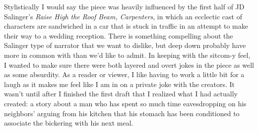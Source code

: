 \documentclass[]{book}
\begin{document}
Stylistically I would say the piece was heavily influenced by the first
half of JD Salinger's \emph{Raise High the Roof Beam, Carpenters}, in
which an ecclectic cast of characters are sandwiched in a car that is
stuck in traffic in an attempt to make their way to a wedding reception.
There is something compelling about the Salinger type of narrator that
we want to dislike, but deep down probably have more in common with than
we'd like to admit. In keeping with the sitcom-y feel, I wanted to make
sure there were both layered and overt jokes in the piece as well as
some absurdity. As a reader or viewer, I like having to work a little
bit for a laugh as it makes me feel like I am in on a private joke with
the creators. It wasn't until after I finished the first draft that I
realized what I had actually created: a story about a man who has spent
so much time eavesdropping on his neighbors' arguing from his kitchen
that his stomach has been conditioned to associate the bickering with
his next meal.


\end{document}
